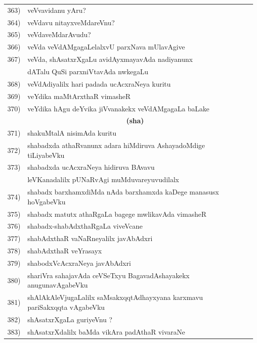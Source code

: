 \begin{longtable}{@{}cp{7.4cm}r}
363) & veVvavidanu yAru? & \pageref{page133}\\
364) & veVdavu nitayxveMdareVnu? & \pageref{page133a}\\
365) & veVdaveMdarAvudu? & \pageref{page132}\\
366) & veVda veVdAMgagaLelalxvU parxNava mUlavAgive & \pageref{page165}\\
367) & veVda, shAsatxrXgaLu avidAyxmayavAda nadiyanunx  & \\
     & dATalu QuSi parxniVtavAda nwkegaLu & \pageref{page42a}\\
 368) & veVdAdiyalilx hari padada ucAcxraNeya kuritu & \pageref{page149}\\
 369) & veYdika maMtArxthaR vimasheR & \pageref{page111a}\\
 370) & veYdika hAgu deYvika jiVvanakekx veVdAMgagaLa baLake & \pageref{page191a}\\[0.3cm]
      & \multicolumn{1}{c}{\textbf{(sha)}} & \\[0.3cm]
 371) &  shakuMtalA nisimAda kuritu & \pageref{page234}\\
 372) & shabadxda athaRvanunx adara hiMdiruva AshayadoMdige tiLiyabeVku & \pageref{page179a}\\
 373) & shabadxda ucAcxraNeya hidiruva BAvavu & \\
      & leVKanadalilx pUNaRvAgi muMduvareyuvudilalx & \pageref{page181}\\
 374) &  shabadx barxhamxdiMda nAda barxhamxda kaDege manasusx hoVgabeVku & \pageref{page161}\\
 375) & shabadx matutx athaRgaLa bagege mwlikavAda vimasheR & \pageref{page111}\\
 376) & shabadx-shabAdxthaRgaLa viveVcane  & \pageref{page113}\\
 377) & shabAdxthaR vaNaRneyalilx javAbAdxri  & \pageref{page112a}\\
 378) & shabAdxthaR veYrasayx & \pageref{page112}\\
 379) & shabodxVcAcxraNeya javAbAdxri & \pageref{page124c}\\
 380) & shariVra sahajavAda ceVSeTxyu BagavadAshayakekx anugunavAgabeVku & \pageref{80}\\
 381) & shAlAkAleVjugaLalilx saMsakxqqtAdhayxyana karxmavu pariSakxqqta vAgabeVku &\pageref{page53a}\\
 382) & shAsatxrXgaLa guriyeVnu ? & \pageref{page93}\\
 383) & shAsatxrXdalilx baMda vikAra padAthaR vivaraNe & \pageref{page225}\\

\end{longtable}

